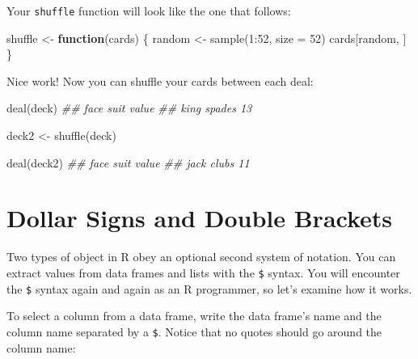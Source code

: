 \documentclass[
  letterpaper,
  DIV=11,
  numbers=noendperiod]{scrbook}
\newenvironment{Shaded}{\begin{snugshade}}{\end{snugshade}}
\newcommand{\AttributeTok}[1]{\textcolor[rgb]{0.40,0.45,0.13}{#1}}
\newcommand{\ControlFlowTok}[1]{\textcolor[rgb]{0.00,0.23,0.31}{\textbf{#1}}}
\newcommand{\DecValTok}[1]{\textcolor[rgb]{0.68,0.00,0.00}{#1}}
\newcommand{\DocumentationTok}[1]{\textcolor[rgb]{0.37,0.37,0.37}{\textit{#1}}}
\newcommand{\FunctionTok}[1]{\textcolor[rgb]{0.28,0.35,0.67}{#1}}
\newcommand{\NormalTok}[1]{\textcolor[rgb]{0.00,0.23,0.31}{#1}}
\newcommand{\OtherTok}[1]{\textcolor[rgb]{0.00,0.23,0.31}{#1}}
\newcommand{\SpecialCharTok}[1]{\textcolor[rgb]{0.37,0.37,0.37}{#1}}
\begin{document}
Your \texttt{shuffle} function will look like the one that follows:

\begin{Shaded}
\begin{Highlighting}[]
\NormalTok{shuffle }\OtherTok{\textless{}{-}} \ControlFlowTok{function}\NormalTok{(cards) \{ }
\NormalTok{  random }\OtherTok{\textless{}{-}} \FunctionTok{sample}\NormalTok{(}\DecValTok{1}\SpecialCharTok{:}\DecValTok{52}\NormalTok{, }\AttributeTok{size =} \DecValTok{52}\NormalTok{)}
\NormalTok{  cards[random, ]}
\NormalTok{\}}
\end{Highlighting}
\end{Shaded}

Nice work! Now you can shuffle your cards between each deal:

\begin{Shaded}
\begin{Highlighting}[]
\FunctionTok{deal}\NormalTok{(deck)}
\DocumentationTok{\#\# face   suit value}
\DocumentationTok{\#\# king spades    13}

\NormalTok{deck2 }\OtherTok{\textless{}{-}} \FunctionTok{shuffle}\NormalTok{(deck) }

\FunctionTok{deal}\NormalTok{(deck2)}
\DocumentationTok{\#\# face  suit value}
\DocumentationTok{\#\# jack clubs    11}
\end{Highlighting}
\end{Shaded}

\section{Dollar Signs and Double
Brackets}\label{dollar-signs-and-double-brackets}

Two types of object in R obey an optional second system of notation. You
can extract values from data frames and lists with the \texttt{\$}
syntax. You will encounter the \texttt{\$} syntax again and again as an
R programmer, so let's examine how it works.

To select a column from a data frame, write the data frame's name and
the column name separated by a \texttt{\$}. Notice that no quotes should
go around the column name:

\begin{Shaded}
\end{Shaded}
\end{document}

